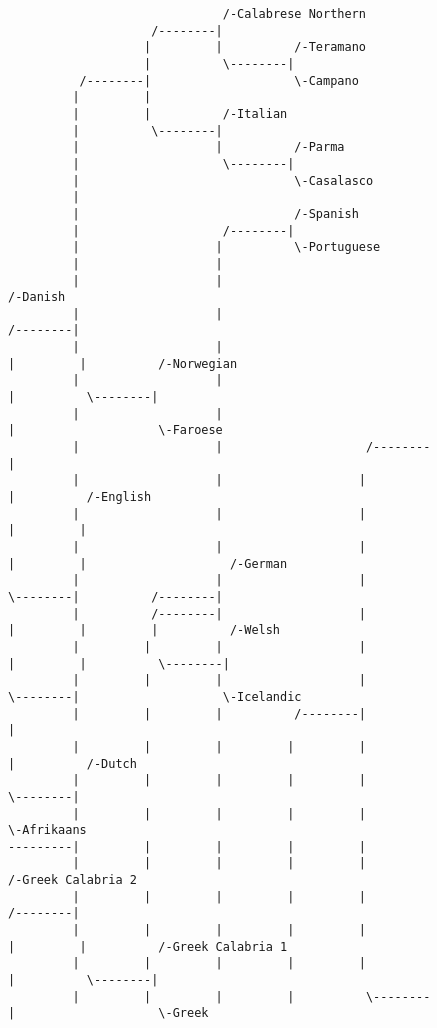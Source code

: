 \begin{figure}[!htb]
\begin{center}
{\begin{verbatim}
                              /-Calabrese Northern
                    /--------|
                   |         |          /-Teramano
                   |          \--------|
          /--------|                    \-Campano
         |         |
         |         |          /-Italian
         |          \--------|
         |                   |          /-Parma
         |                    \--------|
         |                              \-Casalasco
         |
         |                              /-Spanish
         |                    /--------|
         |                   |          \-Portuguese
         |                   |
         |                   |                                        /-Danish
         |                   |                              /--------|
         |                   |                             |         |          /-Norwegian
         |                   |                             |          \--------|
         |                   |                             |                    \-Faroese
         |                   |                    /--------|
         |                   |                   |         |          /-English
         |                   |                   |         |         |
         |                   |                   |         |         |                    /-German
         |                   |                   |          \--------|          /--------|
         |          /--------|                   |                   |         |         |          /-Welsh
         |         |         |                   |                   |         |          \--------|
         |         |         |                   |                    \--------|                    \-Icelandic
         |         |         |          /--------|                             |
         |         |         |         |         |                             |          /-Dutch
         |         |         |         |         |                              \--------|
         |         |         |         |         |                                        \-Afrikaans
---------|         |         |         |         |
         |         |         |         |         |                    /-Greek Calabria 2
         |         |         |         |         |          /--------|
         |         |         |         |         |         |         |          /-Greek Calabria 1
         |         |         |         |         |         |          \--------|
         |         |         |         |          \--------|                    \-Greek

\end{verbatim}}
\end{center}
\end{figure}

